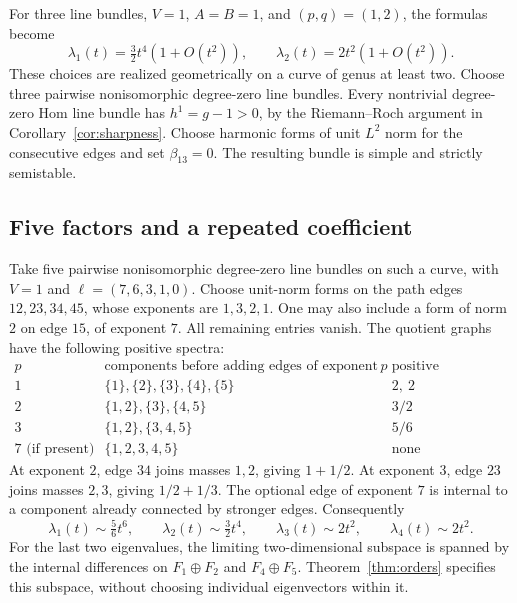 For three line bundles, $V=1$, $A=B=1$, and $(p,q)=(1,2)$, the
formulas become
\begin{equation}\label{eq:three-lines}
 \lambda_1(t)=\tfrac32t^4(1+O(t^2)),\qquad
 \lambda_2(t)=2t^2(1+O(t^2)).
\end{equation}
These choices are realized geometrically on a curve of genus at least
two. Choose three pairwise nonisomorphic degree-zero line bundles.
Every nontrivial degree-zero Hom line bundle has $h^1=g-1>0$, by the
Riemann--Roch argument in Corollary~\ref{cor:sharpness}. Choose harmonic
forms of unit $L^2$ norm for the consecutive edges and set
$\beta_{13}=0$. The resulting bundle is simple and strictly semistable.

\subsection{Five factors and a repeated coefficient}

Take five pairwise nonisomorphic degree-zero line bundles on such a
curve, with $V=1$ and $\ell=(7,6,3,1,0)$. Choose unit-norm forms on the
path edges $12,23,34,45$, whose exponents are $1,3,2,1$. One may also
include a form of norm $2$ on edge $15$, of exponent $7$. All remaining
entries vanish. The quotient graphs have the following positive spectra:
\[
\begin{array}{c|c|c}
 p&\text{components before adding edges of exponent }p
        &\text{positive coefficients}\\ \hline
 1&\{1\},\{2\},\{3\},\{4\},\{5\}&2,\ 2\\
 2&\{1,2\},\{3\},\{4,5\}&3/2\\
 3&\{1,2\},\{3,4,5\}&5/6\\
 7\text{ (if present)}&\{1,2,3,4,5\}&\text{none}
\end{array}
\]
At exponent $2$, edge $34$ joins masses $1,2$, giving $1+1/2$.
At exponent $3$, edge $23$ joins masses $2,3$, giving $1/2+1/3$.
The optional edge of exponent $7$ is internal to a component already
connected by stronger edges. Consequently
\begin{equation}\label{eq:five-lines}
 \lambda_1(t)\sim\tfrac56t^6,\qquad
 \lambda_2(t)\sim\tfrac32t^4,\qquad
 \lambda_3(t)\sim2t^2,\qquad\lambda_4(t)\sim2t^2.
\end{equation}
For the last two eigenvalues, the limiting two-dimensional subspace is
spanned by the internal differences on $F_1\oplus F_2$ and
$F_4\oplus F_5$. Theorem~\ref{thm:orders} specifies this subspace,
without choosing individual eigenvectors within it.
